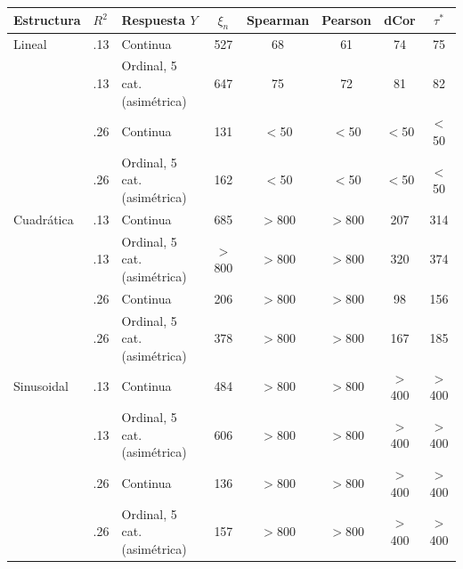 \begin{tabular}{lllccccc}
\toprule
Estructura & $R^2$ & Respuesta $Y$ & $\xi_n$ & Spearman & Pearson & dCor & $\tau^*$ \\
\midrule
Lineal & .13 & Continua & 527 & 68 & 61 & 74 & 75 \\
 & .13 & Ordinal, 5 cat. (asim\'etrica) & 647 & 75 & 72 & 81 & 82 \\
 & .26 & Continua & 131 & $<$50 & $<$50 & $<$50 & $<$50 \\
 & .26 & Ordinal, 5 cat. (asim\'etrica) & 162 & $<$50 & $<$50 & $<$50 & $<$50 \\
\addlinespace
Cuadr\'atica & .13 & Continua & 685 & $>$800 & $>$800 & 207 & 314 \\
 & .13 & Ordinal, 5 cat. (asim\'etrica) & $>$800 & $>$800 & $>$800 & 320 & 374 \\
 & .26 & Continua & 206 & $>$800 & $>$800 & 98 & 156 \\
 & .26 & Ordinal, 5 cat. (asim\'etrica) & 378 & $>$800 & $>$800 & 167 & 185 \\
\addlinespace
Sinusoidal & .13 & Continua & 484 & $>$800 & $>$800 & $>$400 & $>$400 \\
 & .13 & Ordinal, 5 cat. (asim\'etrica) & 606 & $>$800 & $>$800 & $>$400 & $>$400 \\
 & .26 & Continua & 136 & $>$800 & $>$800 & $>$400 & $>$400 \\
 & .26 & Ordinal, 5 cat. (asim\'etrica) & 157 & $>$800 & $>$800 & $>$400 & $>$400 \\
\bottomrule
\end{tabular}
